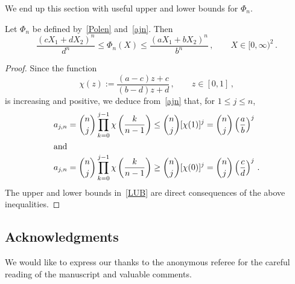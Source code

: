 \documentclass[AHL,Unicode,longabstracts,published]{cedram}
\begin{document}
We end up this section with useful upper and lower bounds for $\Phi_n$.


\begin{lemm}\label{lelfb}
Let $\Phi_n$ be defined by~\eqref{Polen} and~\eqref{ajn}. Then
\begin{equation}\label{LUB}
\frac{(c X_1 + d X_2)^n}{d^n} \le \Phi_n(X) \le \frac{(a X_1 + b X_2)^n}{b^n}\,, \qquad X\in [0,\infty)^2\,.
\end{equation}
\end{lemm}


\begin{proof}
Since the function
\begin{equation*}
\chi (z) := \frac{ (a-c) z+c}{(b-d) z+d}\,, \qquad z\in [0,1]\,,
\end{equation*}
is increasing and positive, we deduce from~\eqref{ajn} that, for $1\le j \le n$,
\begin{align*}
a_{j,n} &= \binom{n}{j} \prod_{k=0}^{j-1}\chi\left(\frac{k}{n-1} \right)\leq \binom{n}{j} [\chi(1)]^j=\binom{n}{j} \left(\frac{a}{b} \right)^j\\
\intertext{and}
a_{j,n} &= \binom{n}{j} \prod_{k=0}^{j-1}\chi\left(\frac{k}{n-1} \right)\geq \binom{n}{j} [\chi(0)]^j=\binom{n}{j} \left(\frac{c}{d} \right)^j\,.
\end{align*}
The upper and lower bounds in~\eqref{LUB} are direct consequences of the above inequalities.
\end{proof}


\subsection*{Acknowledgments}
We would like to express our thanks to the anonymous referee for the careful reading of the manuscript and valuable comments.


\end{document}
